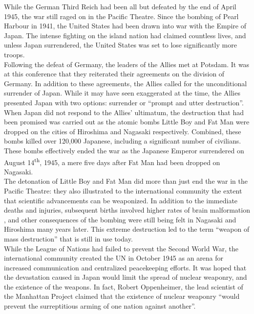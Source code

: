 \documentclass[12pt]{article}
\begin{document}
While the German Third Reich had been all but defeated by the end of April 1945\cite{1}, the war still raged on in the Pacific Theatre. Since the bombing of Pearl Harbour in 1941, the United States had been drawn into war with the Empire of Japan\cite{2}. The intense fighting on the island nation had claimed countless lives, and unless Japan surrendered, the United States was set to lose significantly more troops.\\

Following the defeat of Germany, the leaders of the Allies met at Potsdam. It was at this conference that they reiterated their agreements on the division of Germany\cite{3}. In addition to these agreements, the Allies called for the unconditional surrender of Japan\cite{3}. While it may have seen exaggerated at the time, the Allies presented Japan with two options: surrender or ``prompt and utter destruction''\cite{3}.\\

When Japan did not respond to the Allies' ultimatum, the destruction that had been promised was carried out as the atomic bombs Little Boy and Fat Man were dropped on the cities of Hiroshima and Nagasaki respectively\cite{4}. Combined, these bombs killed over 120,000 Japanese, including a significant number of civilians\cite{4}. These bombs effectively ended the war as the Japanese Emperor surrendered on August 14\textsuperscript{th}, 1945, a mere five days after Fat Man had been dropped on Nagasaki\cite{4}.\\

The detonation of Little Boy and Fat Man did more than just end the war in the Pacific Theatre: they also illustrated to the international community the extent that scientific advancements can be weaponized. In addition to the immediate deaths and injuries, subsequent births involved higher rates of brain malformation \cite{5}, and other consequences of the bombing were still being felt in Nagasaki and Hiroshima many years later. This extreme destruction led to the term ``weapon of mass destruction'' that is still in use today.\\
 
While the League of Nations had failed to prevent the Second World War\cite{6}, the international community created the UN  in October 1945 as an arena for increased communication and centralized peacekeeping efforts\cite{7}. It was hoped that the devastation caused in Japan would limit the spread of nuclear weaponry, and the existence of the weapons. In fact, Robert Oppenheimer, the lead scientist of the Manhattan Project claimed that the existence of nuclear weaponry ``would prevent the surreptitious arming of one nation against another''\cite{8}.\\
\end{document}

